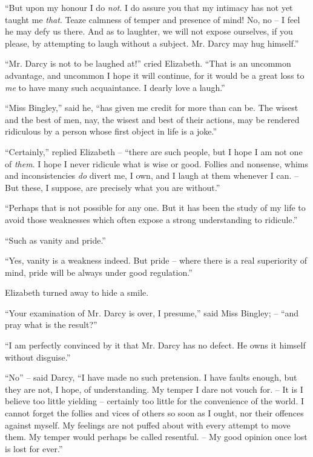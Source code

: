 “But upon my honour I do \textit{not}. I do assure you that
my intimacy has not yet taught me \textit{that}. Teaze calmness of
temper and presence of mind! No, no -- I feel he may defy
us there. And as to laughter, we will not expose ourselves,
if you please, by attempting to laugh without a subject.
Mr. Darcy may hug himself.”

“Mr. Darcy is not to be laughed at!” cried Elizabeth.
“That is an uncommon advantage, and uncommon I hope
it will continue, for it would be a great loss to \textit{me} to have
many such acquaintance. I dearly love a laugh.”

“Miss Bingley,” said he, “has given me credit for more
than can be. The wisest and the best of men, nay, the
wisest and best of their actions, may be rendered ridiculous
by a person whose first object in life is a joke.”

“Certainly,” replied Elizabeth -- “there are such people,
but I hope I am not one of \textit{them}. I hope I never ridicule
what is wise or good. Follies and nonsense, whims and
inconsistencies \textit{do} divert me, I own, and I laugh at them
whenever I can. -- But these, I suppose, are precisely what
you are without.”

“Perhaps that is not possible for any one. But it has
been the study of my life to avoid those weaknesses which
often expose a strong understanding to ridicule.”

“Such as vanity and pride.”

“Yes, vanity is a weakness indeed. But pride -- where
there is a real superiority of mind, pride will be always
under good regulation.”

Elizabeth turned away to hide a smile.

“Your examination of Mr. Darcy is over, I presume,”
said Miss Bingley; -- “and pray what is the result?”

“I am perfectly convinced by it that Mr. Darcy has
no defect. He owns it himself without disguise.”

“No” -- said Darcy, “I have made no such pretension.
I have faults enough, but they are not, I hope, of understanding.
My temper I dare not vouch for. -- It is I believe
too little yielding -- certainly too little for the convenience
of the world. I cannot forget the follies and vices of others
so soon as I ought, nor their offences against myself.
My feelings are not puffed about with every attempt to
move them. My temper would perhaps be called
resentful. -- My good opinion once lost is lost for ever.”

